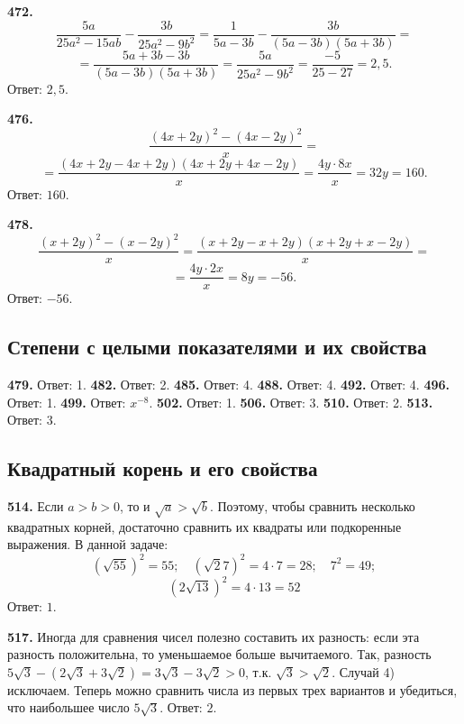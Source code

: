 \textbf{472.} $$\frac{5a}{25a^2-15ab}-\frac{3b}{25a^2-9b^2}=\frac{1}{5a-3b}-\frac{3b}{\left(5a-3b\right)\left(5a+3b\right)}=$$ $$=\frac{5a+3b-3b}{\left(5a-3b\right)\left(5a+3b\right)}=\frac{5a}{25a^2-9b^2}=\frac{-5}{25-27}=2,5.$$ \newline \null \hspace*{\fill} Ответ: $2,5$. 

\textbf{476.} $$\frac{\left(4x+2y\right)^2-\left(4x-2y\right)^2}{x}=$$$$=\frac{\left(4x+2y-4x+2y\right)\left(4x+2y+4x-2y\right)}{x}=\frac{4y\cdot8x}{x}=32y=160.$$ \newline \null \hspace*{\fill} Ответ: $160$. 

\textbf{478.} $$\frac{\left(x+2y\right)^2-\left(x-2y\right)^2}{x}=\frac{\left(x+2y-x+2y\right)\left(x+2y+x-2y\right)}{x}=$$ $$=\frac{4y\cdot2x}{x}=8y=-56.$$ \newline \null \hspace*{\fill} Ответ: $-56$. 

\subsection{Степени с целыми показателями и их свойства}


\textbf{479.}  Ответ: 1.  \textbf{482.}  Ответ: 2.  \textbf{485.}  Ответ: 4.  \textbf{488.}  Ответ: 4.  \textbf{492.}  Ответ: 4. \textbf{496.}  Ответ: 1. \textbf{499.}  Ответ: $x^{-8}$.   \textbf{502.}  Ответ: 1.  \textbf{506.} Ответ: 3. \textbf{510.}  Ответ: 2.  \textbf{513.}  Ответ: 3.

\subsection{Квадратный корень и его свойства}


\textbf{514.} Если $a>b>0$, то и $\sqrt{a}>\sqrt{b}$. Поэтому, чтобы сравнить несколько квадратных корней, достаточно сравнить их квадраты или подкоренные выражения.  В данной задаче: $$\left(\sqrt{55}\right)^2=55;\quad \left(\sqrt2{7}\right)^2=4\cdot7=28;\quad 7^2=49;$$$$ \left(2\sqrt{13}\right)^2=4\cdot13=52$$ \newline \null \hspace*{\fill} Ответ: $1$. 

\textbf{517.} Иногда для сравнения чисел полезно составить их разность: если эта разность положительна, то уменьшаемое больше вычитаемого. Так, разность $5\sqrt{3}-\left(2\sqrt{3}+3\sqrt{2}\right)=3\sqrt{3}-3\sqrt{2}>0$, т.к. $\sqrt{3}>\sqrt{2}$. Случай 4) исключаем. Теперь можно сравнить числа из первых трех вариантов и убедиться, что наибольшее число $5\sqrt{3}$. \newline \null \hspace*{\fill} Ответ: $2$. 

